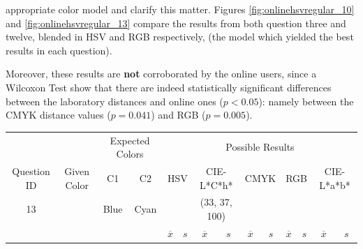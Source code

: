 appropriate color model and clarify this matter. Figures \ref{fig:onlinehsvregular_10} and \ref{fig:onlinehsvregular_13} compare the results from both question three and twelve, blended in HSV and RGB respectively,
(the model which yielded the best results in each question). \par
%
Moreover, these results are \textbf{not} corroborated by the online users, since a Wilcoxon Test show that there are indeed statistically significant differences between the laboratory distances
and online ones ($p < 0.05$): namely between the CMYK distance values ($p = 0.041$) and RGB ($p = 0.005$).
%
\begin{table}[H]
  \resizebox{\textwidth}{!} {
  \begin{tabular}{lccccccccccccc}
    \hline
    \multicolumn{1}{c}{}                              &                                      & \multicolumn{2}{c}{Expected Colors}                   & \multicolumn{10}{c}{Possible Results}                                                                                                                                                                                                                                                                                        \\ \cline{3-14}
    \multicolumn{1}{c}{\multirow{-2}{*}{Question ID}} & \multirow{-2}{*}{Given Color}        & C1                       & C2                         & \multicolumn{2}{c}{HSV}                                        & \multicolumn{2}{c}{CIE-L*C*h*}                                 & \multicolumn{2}{c}{CMYK}                                       & \multicolumn{2}{c}{RGB}                                        & \multicolumn{2}{c}{CIE-L*a*b*}                                 \\ \hline
    \multicolumn{1}{c}{13}                             & \cellcolor[HTML]{0080FF}{\color[HTML]{FFFFFF}(26, 23, 98)} & \multicolumn{1}{c|}{Blue} & \multicolumn{1}{c|}{Cyan}  & \multicolumn{2}{c|}{\cellcolor[HTML]{0080FF}{\color[HTML]{FFFFFF}(26, 23, 98)}}      & \multicolumn{2}{c|}{\cellcolor[HTML]{00ACFF}(33, 37, 100)}       & \multicolumn{2}{c|}{\cellcolor[HTML]{0080FF}{\color[HTML]{FFFFFF}(26, 23, 98)}}       & \multicolumn{2}{c|}{\cellcolor[HTML]{0080FF}{\color[HTML]{FFFFFF}(26, 23, 98)}}       & \multicolumn{2}{c|}{\cellcolor[HTML]{5792FF}{\color[HTML]{FFFFFF}(32, 30, 99)}}       \\ \hline
                                                      & \multicolumn{1}{l}{}                 & \multicolumn{1}{l}{}     & \multicolumn{1}{l}{}       & \multicolumn{1}{c}{$\overline{x}$} & \multicolumn{1}{c}{$s$} & \multicolumn{1}{c}{$\overline{x}$} & \multicolumn{1}{c}{$s$} & \multicolumn{1}{c}{$\overline{x}$} & \multicolumn{1}{c}{$s$} & \multicolumn{1}{c}{$\overline{x}$} & \multicolumn{1}{c}{$s$} & \multicolumn{1}{c}{$\overline{x}$} & \multicolumn{1}{c}{$s$} \\ \hline

\end{tabular}}
\end{table}
